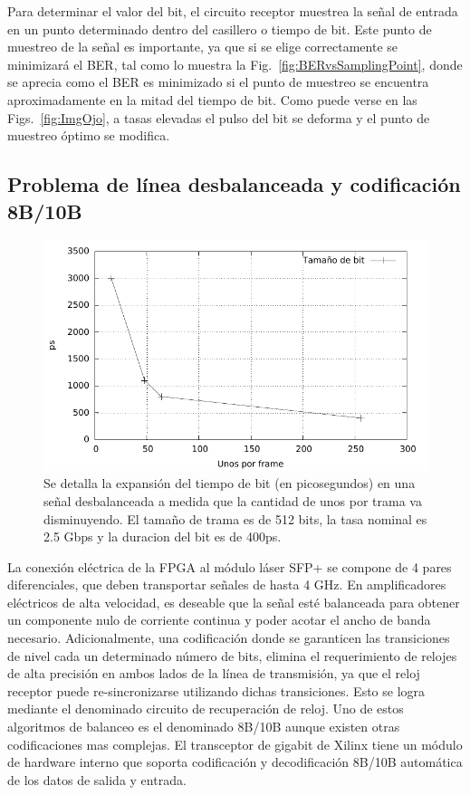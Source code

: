 Para determinar el valor del bit, el circuito receptor muestrea la señal de entrada en un punto determinado dentro del casillero o tiempo de bit. Este punto de muestreo de la señal es importante, ya que si se elige correctamente se minimizará el BER, tal como lo muestra la Fig.~\ref{fig:BERvsSamplingPoint}, donde se aprecia como el BER es minimizado si el punto de muestreo se encuentra aproximadamente en la mitad del tiempo de bit. 
Como puede verse en las Figs.~\ref{fig:ImgOjo}, a tasas elevadas el pulso del bit se deforma y el punto de muestreo óptimo se modifica.


\subsection{Problema de línea desbalanceada y codificación 8B/10B}
\label{problemacodificacion}
\begin{figure}[t]
  \centering
    \includegraphics[width=5in]{graphs/expansionbit.pdf}
\caption {Se detalla la expansión del tiempo de bit (en picosegundos) en una señal desbalanceada a medida que la cantidad de unos por trama va disminuyendo. El tamaño de trama es de 512 bits, la tasa nominal es 2.5 Gbps y la duracion del bit es de 400ps.}
\label{fig:expansionbit}
\end{figure}

\label{problema8b10b}
La conexión eléctrica de la FPGA al módulo láser SFP+ se compone de 4 pares diferenciales, que deben transportar señales de hasta 4 GHz. En amplificadores eléctricos de alta velocidad, es deseable que la señal esté balanceada para obtener un componente nulo de corriente continua y poder acotar el ancho de banda necesario. Adicionalmente, una codificación donde se garanticen las transiciones de nivel cada un determinado número de bits, elimina el requerimiento de relojes de alta precisión en ambos lados de la línea de transmisión, ya que el reloj receptor puede re-sincronizarse utilizando dichas transiciones. Esto se logra mediante el denominado circuito de recuperación de reloj.
Uno de estos algoritmos de balanceo es el denominado 8B/10B aunque existen otras codificaciones mas complejas. El transceptor de gigabit de Xilinx tiene un módulo de hardware interno que soporta codificación y decodificación 8B/10B automática de los datos de salida y entrada.

